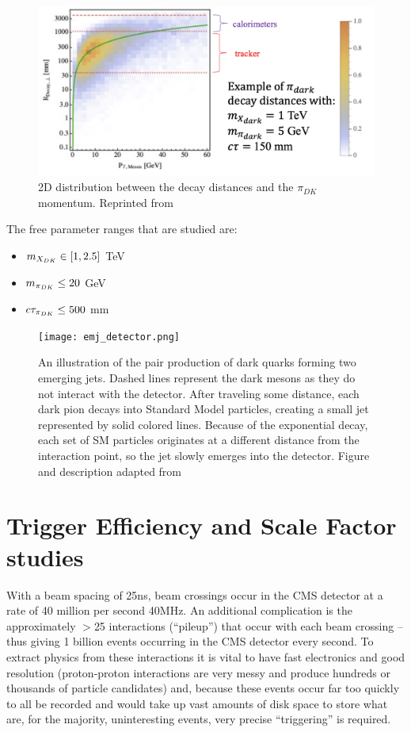 \begin{figure}[tb]
	\centering
	\includegraphics[width=.75\linewidth]{Images/Decay-distances-emj.png}
	\caption[2D distributions of decay distances and $\pi_{DK}$ momentum]{2D distribution between the decay distances and the $\pi_{DK}$ momentum. Reprinted from \cite{Schwaller:2015gea}}
	\label{fig:decay-distance}
\end{figure}

The free parameter ranges that are studied are:
\begin{itemize}
	\item $m_{X_{DK}} \in [1,2.5]$ TeV
	\item $m_{\pi_{DK}} \leq 20$ GeV
	\item $c\tau_{\pi_{DK}} \leq 500$ mm
\end{itemize}


\begin{figure}
	\centering
	\texttt{[image: emj\_detector.png]}
	\caption[Illustration of the emerging jets forming in a detector]{An illustration of the pair production of dark quarks forming two emerging jets. Dashed lines represent the dark mesons as they do not interact with the detector. After traveling some distance, each dark pion decays into Standard Model particles, creating a small jet represented by solid colored lines. Because of the exponential decay, each set of SM particles originates at a different distance from the interaction point, so the jet slowly emerges into the detector. Figure and description adapted from \cite{Schwaller:2015gea}}
	\label{fig:2emj_inCMS}
\end{figure}


\clearpage

\section{Trigger Efficiency and Scale Factor studies}


With a beam spacing of 25\unit{ns}, beam crossings occur in the CMS detector at a rate of 40 million per second 40\unit{\MHz}.
An additional complication is the approximately $>$25 interactions (``pileup'') that occur with each beam crossing -- thus giving 1 billion events occurring in the CMS detector every second. To extract physics from these interactions it is vital to have fast electronics and good resolution (proton-proton interactions are very messy and produce hundreds or thousands of particle candidates) and, because these events occur far too quickly to all be recorded and would take up vast amounts of disk space to store what are, for the majority, uninteresting events, very precise ``triggering'' is required.

